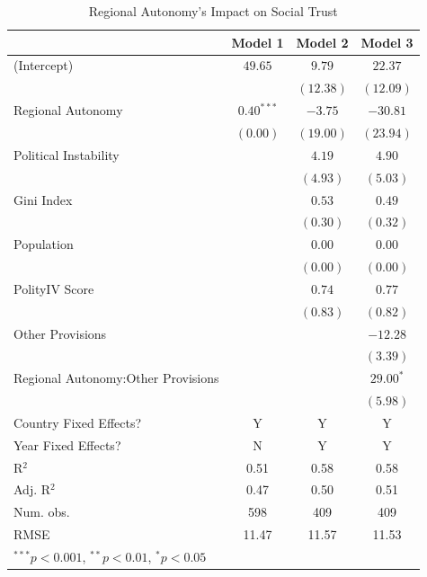 \documentclass[12pt]{article}
\begin{document}
\begin{table}[!htbp]
	\begin{center}
		\begin{tabular}{lccc}
			\hline
			& Model 1 & Model 2 & Model 3 \\
			\hline
			(Intercept)                  & $49.65$      & $9.79$    & $22.37$     \\
			& $ $           & $(12.38)$ & $(12.09)$   \\
			Regional Autonomy                   & $0.40^{***}$ & $-3.75$   & $-30.81$    \\
			& $(0.00)$     & $(19.00)$ & $(23.94)$   \\
			Political Instability               &              & $4.19$    & $4.90$      \\
			&              & $(4.93)$  & $(5.03)$    \\
			Gini Index               &              & $0.53$    & $0.49$      \\
			&              & $(0.30)$  & $(0.32)$    \\
			Population                &              & $0.00$    & $0.00$      \\
			&              & $(0.00)$  & $(0.00)$    \\
			PolityIV Score       &              & $0.74$    & $0.77$      \\
			&              & $(0.83)$  & $(0.82)$    \\
			Other Provisions            &              &           & $-12.28$    \\
			&              &           & $(3.39)$    \\
			Regional Autonomy:Other Provisions &              &           & $29.00^{*}$ \\
			&              &           & $(5.98)$    \\
			\hline
			Country Fixed Effects?		 & Y			& Y 		& Y			  \\
			Year Fixed Effects?			 & N			& Y			& Y			  \\
			R$^2$                        & 0.51         & 0.58      & 0.58        \\
			Adj. R$^2$                   & 0.47         & 0.50      & 0.51        \\
			Num. obs.                    & 598          & 409       & 409         \\
			RMSE                         & 11.47        & 11.57     & 11.53       \\
			\hline
			\multicolumn{4}{l}{\scriptsize{$^{***}p<0.001$, $^{**}p<0.01$, $^*p<0.05$}}
		\end{tabular}
		\caption{Regional Autonomy's Impact on Social Trust}
		\label{table:coefficients}
	\end{center}
\end{table}
			
\end{document}
